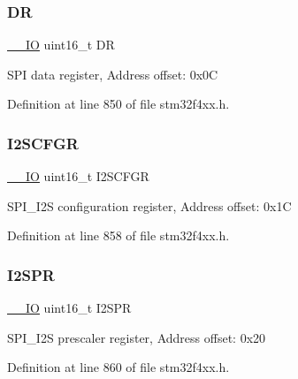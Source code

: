 \subsubsection{\texorpdfstring{DR}{DR}}
{\footnotesize\ttfamily \hyperlink{group___c_m_s_i_s__core__definitions_gaec43007d9998a0a0e01faede4133d6be}{\+\_\+\+\_\+\+IO} uint16\+\_\+t DR}

S\+PI data register, Address offset\+: 0x0C 

Definition at line 850 of file stm32f4xx.\+h.

\mbox{\label{struct_s_p_i___type_def_acb40abca5ca4cd2b2855adf2186effe8}} 
\subsubsection{\texorpdfstring{I2\+S\+C\+F\+GR}{I2SCFGR}}
{\footnotesize\ttfamily \hyperlink{group___c_m_s_i_s__core__definitions_gaec43007d9998a0a0e01faede4133d6be}{\+\_\+\+\_\+\+IO} uint16\+\_\+t I2\+S\+C\+F\+GR}

S\+P\+I\+\_\+\+I2S configuration register, Address offset\+: 0x1C 

Definition at line 858 of file stm32f4xx.\+h.

\mbox{\label{struct_s_p_i___type_def_a02ce1ece243cc4ce1d66ebeca247fee1}} 
\subsubsection{\texorpdfstring{I2\+S\+PR}{I2SPR}}
{\footnotesize\ttfamily \hyperlink{group___c_m_s_i_s__core__definitions_gaec43007d9998a0a0e01faede4133d6be}{\+\_\+\+\_\+\+IO} uint16\+\_\+t I2\+S\+PR}

S\+P\+I\+\_\+\+I2S prescaler register, Address offset\+: 0x20 

Definition at line 860 of file stm32f4xx.\+h.

\mbox{\label{struct_s_p_i___type_def_a149feba01f9c4a49570c6d88619f504f}} 
